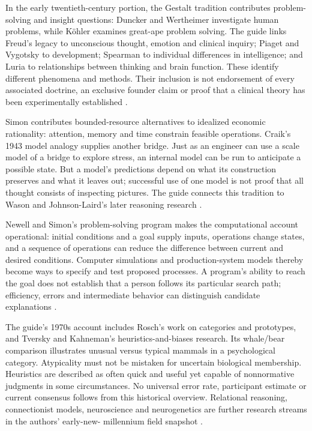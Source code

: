 In the early twentieth-century portion, the Gestalt tradition contributes
problem-solving and insight questions: Duncker and Wertheimer investigate
human problems, while K\"ohler examines great-ape problem solving. The guide
links Freud's legacy to unconscious thought, emotion and clinical inquiry;
Piaget and Vygotsky to development; Spearman to individual differences in
intelligence; and Luria to relationships between thinking and brain function.
These identify different phenomena and methods. Their inclusion is not
endorsement of every associated doctrine, an exclusive founder claim or
proof that a clinical theory has been experimentally established
\parencite[p.~3]{HolyoakMorrison2012ReadersGuide}.

Simon contributes bounded-resource alternatives to idealized economic
rationality: attention, memory and time constrain feasible operations.
Craik's 1943 model analogy supplies another bridge. Just as an engineer
can use a scale model of a bridge to explore stress, an internal model can
be run to anticipate a possible state. But a model's predictions depend on
what its construction preserves and what it leaves out; successful use of
one model is not proof that all thought consists of inspecting pictures.
The guide connects this tradition to Wason and Johnson-Laird's later
reasoning research \parencite[p.~3, note~4 on p.~7]{HolyoakMorrison2012ReadersGuide}.

Newell and Simon's problem-solving program makes the computational account
operational: initial conditions and a goal supply inputs, operations change
states, and a sequence of operations can reduce the difference between
current and desired conditions. Computer simulations and production-system
models thereby become ways to specify and test proposed processes. A
program's ability to reach the goal does not establish that a person follows
its particular search path; efficiency, errors and intermediate behavior
can distinguish candidate explanations
\parencite[pp.~3--4]{HolyoakMorrison2012ReadersGuide}.

The guide's 1970s account includes Rosch's work on categories and prototypes,
and Tversky and Kahneman's heuristics-and-biases research. Its whale/bear
comparison illustrates unusual versus typical mammals in a psychological
category. Atypicality must not be mistaken for uncertain biological
membership. Heuristics are described as often quick and useful yet capable
of nonnormative judgments in some circumstances. No universal error rate,
participant estimate or current consensus follows from this historical
overview. Relational reasoning, connectionist models, neuroscience and
neurogenetics are further research streams in the authors' early-new-
millennium field snapshot \parencite[p.~4]{HolyoakMorrison2012ReadersGuide}.

